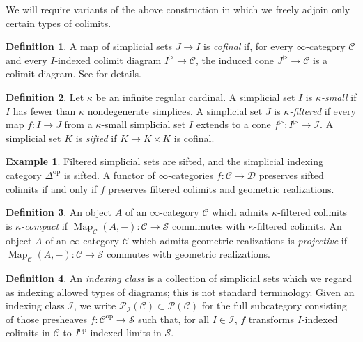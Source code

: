 \documentclass{article}
\theoremstyle{definition}
\newtheorem{definition}{Definition}[subsection]
\newtheorem{example}{Example}[subsection]
\newcommand{\C}{\mathcal{C}}
\newcommand{\D}{\mathcal{D}}
\newcommand{\I}{\mathcal{I}}
\renewcommand{\P}{\mathcal{P}}
\renewcommand{\S}{\mathcal{S}}
\renewcommand{\i}{\infty}
\newcommand{\op}{\mathrm{op}}
\DeclareMathOperator{\Map}{Map}
\begin{document}
We will require variants of the above construction in which we freely adjoin only certain types of colimits.

\begin{definition}
A map of simplicial sets $J\to I$ is {\em cofinal} if, for every $\i$-category $\C$ and every $I$-indexed colimit diagram $I^\triangleright\to\C$, the induced cone $J^\triangleright\to\C$ is a colimit diagram. See \cite[Proposition 4.1.1.8]{HTT} for details.
\end{definition}



\begin{definition}
Let $\kappa$ be an infinite regular cardinal.
A simplicial set $I$ is {\em $\kappa$-small} if $I$ has fewer than $\kappa$ nondegenerate simplices.
A simplicial set $J$ is {\em $\kappa$-filtered} if every map $f:I\to J$ from a $\kappa$-small simplicial set $I$ extends to a cone $f^\triangleright:I^\triangleright\to\I$.
A simplicial set $K$ is {\em sifted} if $K\to K\times K$ is cofinal.
\end{definition}

\begin{example}
Filtered simplicial sets are sifted, and the simplicial indexing category $\Delta^{\op}$ is sifted.
A functor of $\i$-categories $f:\C\to\D$ preserves sifted colimits if and only if $f$ preserves filtered colimits and geometric realizations.
\end{example}

 \begin{definition}
 An object $A$ of an $\i$-category $\C$ which admits $\kappa$-filtered colimits is {\em $\kappa$-compact} if $\Map_\C(A,-):\C\to\S$ commmutes with $\kappa$-filtered colimits.
An object $A$ of an $\i$-category $\C$ which admits geometric realizations is {\em projective} if $\Map_\C(A,-):\C\to\S$ commutes with geometric realizations.
 \end{definition}

\begin{definition}
An {\em indexing class} is a collection of simplicial sets which we regard as indexing allowed types of diagrams; this is not standard terminology.
Given an indexing class $\I$, we write $\P_\I(\C)\subset\P(\C)$ for the full subcategory consisting of those presheaves $f:\C^{\op}\to\S$ such that, for all $I\in\I$, $f$ transforms $I$-indexed colimits in $\C$ to $I^{\op}$-indexed limits in $\S$.
\end{definition}
\end{document}
